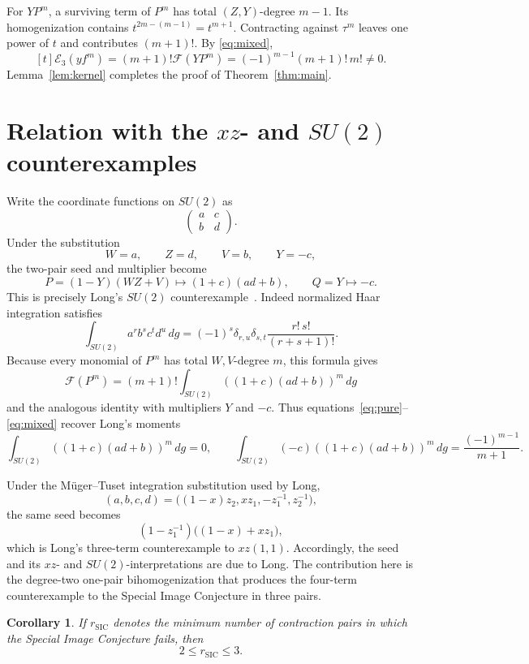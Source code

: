 \documentclass[11pt]{article}
\newtheorem{corollary}[theorem]{Corollary}
\newcommand{\Eop}{\mathcal E}
\begin{document}
For \(YP^m\), a surviving term of \(P^m\) has total
\((Z,Y)\)-degree \(m-1\).  Its homogenization contains
\(t^{2m-(m-1)}=t^{m+1}\).  Contracting against \(\tau^m\)
leaves one power of \(t\) and contributes \((m+1)!\).  By
\eqref{eq:mixed},
\[
 [t]\Eop_3(yf^m)
 =(m+1)!\mathcal F(YP^m)
 =(-1)^{m-1}(m+1)!\,m!\neq0.
\]
Lemma~\ref{lem:kernel} completes the proof of
Theorem~\ref{thm:main}.

\section{Relation with the
  \texorpdfstring{\(xz\)- and \(SU(2)\)}{xz- and SU(2)} counterexamples}

Write the coordinate functions on \(SU(2)\) as
\[
 \begin{pmatrix}a&c\\ b&d\end{pmatrix}.
\]
Under the substitution
\[
 W=a,\qquad Z=d,\qquad V=b,\qquad Y=-c,
\]
the two-pair seed and multiplier become
\[
 P=(1-Y)(WZ+V)\longmapsto(1+c)(ad+b),\qquad
 Q=Y\longmapsto-c.
\]
This is precisely Long's \(SU(2)\) counterexample~\cite{Long2026}.
Indeed normalized Haar integration satisfies
\[
 \int_{SU(2)}a^r b^s c^t d^u\,dg
 =(-1)^s\delta_{r,u}\delta_{s,t}
   \frac{r!\,s!}{(r+s+1)!}.
\]
Because every monomial of \(P^m\) has total \(W,V\)-degree \(m\),
this formula gives
\[
 \mathcal F(P^m)=(m+1)!\int_{SU(2)}((1+c)(ad+b))^m\,dg
\]
and the analogous identity with multipliers \(Y\) and \(-c\).
Thus equations~\eqref{eq:pure}--\eqref{eq:mixed} recover Long's moments
\[
 \int_{SU(2)}((1+c)(ad+b))^m\,dg=0,\qquad
 \int_{SU(2)}(-c)((1+c)(ad+b))^m\,dg
 =\frac{(-1)^{m-1}}{m+1}.
\]

Under the Müger--Tuset integration substitution used by Long,
\[
 (a,b,c,d)
 =\bigl((1-x)z_2,xz_1,-z_1^{-1},z_2^{-1}\bigr),
\]
the same seed becomes
\[
 (1-z_1^{-1})\bigl((1-x)+xz_1\bigr),
\]
which is Long's three-term counterexample to \(xz(1,1)\).
Accordingly, the seed and its \(xz\)- and \(SU(2)\)-interpretations are
due to Long.  The contribution here is the degree-two one-pair
bihomogenization that produces the four-term counterexample to the Special
Image Conjecture in three pairs.

\begin{corollary}
If \(r_{\mathrm{SIC}}\) denotes the minimum number of contraction pairs
in which the Special Image Conjecture fails, then
\[
 2\leq r_{\mathrm{SIC}}\leq3.
\]
\end{corollary}
\end{document}
